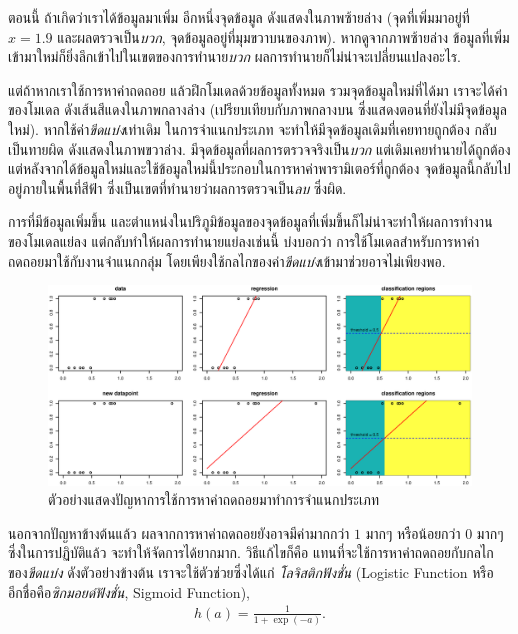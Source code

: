ตอนนี้ ถ้าเกิดว่าเราได้ข้อมูลมาเพิ่ม อีกหนึ่งจุดข้อมูล 
ดังแสดงในภาพซ้ายล่าง 
(จุดที่เพิ่มมาอยู่ที่ $x = 1.9$ และผลตรวจเป็น\textit{บวก}, จุดข้อมูลอยู่ที่มุมขวาบนของภาพ).
หากดูจากภาพซ้ายล่าง ข้อมูลที่เพิ่มเข้ามาใหม่ก็ยิ่งลึกเข้าไปในเขตของการทำนาย\textit{บวก} ผลการทำนายก็ไม่น่าจะเปลี่ยนแปลงอะไร.

แต่ถ้าหากเราใช้การหาค่าถดถอย แล้วฝึกโมเดลด้วยข้อมูลทั้งหมด รวมจุดข้อมูลใหม่ที่ได้มา 
เราจะได้ค่าของโมเดล ดังเส้นสีแดงในภาพกลางล่าง (เปรียบเทียบกับภาพกลางบน ซึ่งแสดงตอนที่ยังไม่มีจุดข้อมูลใหม่).
หากใช้ค่า\textit{ขีดแบ่ง}เท่าเดิม ในการจำแนกประเภท
จะทำให้มีจุดข้อมูลเดิมที่เคยทายถูกต้อง กลับเป็นทายผิด
ดังแสดงในภาพขวาล่าง.
มีจุดข้อมูลที่ผลการตรวจจริงเป็น\textit{บวก} แต่เดิมเคยทำนายได้ถูกต้อง 
แต่หลังจากได้ข้อมูลใหม่และใช้ข้อมูลใหม่นี้ประกอบในการหาค่าพารามิเตอร์ที่ถูกต้อง จุดข้อมูลนี้กลับไปอยู่ภายในพื้นที่สีฟ้า ซึ่งเป็นเขตที่ทำนายว่าผลการตรวจเป็น\textit{ลบ} ซึ่งผิด.

การที่มีข้อมูลเพิ่มขึ้น และตำแหน่งในปริภูมิข้อมูลของจุดข้อมูลที่เพิ่มขึ้นก็ไม่น่าจะทำให้ผลการทำงานของโมเดลแย่ลง
แต่กลับทำให้ผลการทำนายแย่ลงเช่นนี้ บ่งบอกว่า 
การใช้โมเดลสำหรับการหาค่าถดถอยมาใช้กับงานจำแนกกลุ่ม 
โดยเพียงใช้กลไกของค่า\textit{ขีดแบ่ง}เข้ามาช่วยอาจไม่เพียงพอ.

%
\begin{figure}
\begin{center}
\includegraphics[width=5.5in]{03Linear/classRegressionThreshold.eps}
\end{center}
\caption{ตัวอย่างแสดงปัญหาการใช้การหาค่าถดถอยมาทำการจำแนกประเภท}
\label{fig: linear classification regression threshold}
\end{figure}
%

นอกจากปัญหาข้างต้นแล้ว ผลจากการหาค่าถดถอยยังอาจมีค่ามากกว่า $1$ มากๆ หรือน้อยกว่า $0$ มากๆ 
ซึ่งในการปฏิบัติแล้ว จะทำให้จัดการได้ยากมาก.
วิธีแก้ไขก็คือ แทนที่จะใช้การหาค่าถดถอยกับกลไกของ\textit{ขีดแบ่ง} ดังตัวอย่างข้างต้น 
เราจะใช้ตัวช่วยซึ่งได้แก่ \textit{โลจิสติกฟังชั่น} (Logistic Function หรือ อีกชื่อคือ\textit{ซิกมอยด์ฟังชั่น}, Sigmoid Function),    
\begin{eqnarray}
   h(a) = \frac{1}{1 + \exp (-a) }.
\label{eq: sigmoid function}
\end{eqnarray}

